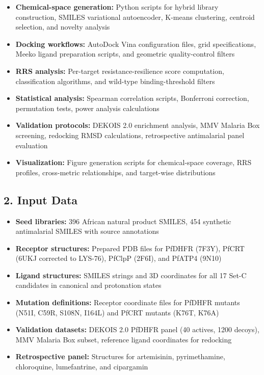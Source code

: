 \documentclass[11pt,a4paper]{article}
\begin{document}
\begin{itemize}[leftmargin=*]
\item \textbf{Chemical-space generation:} Python scripts for hybrid library construction, SMILES variational autoencoder, K-means clustering, centroid selection, and novelty analysis
\item \textbf{Docking workflows:} AutoDock Vina configuration files, grid specifications, Meeko ligand preparation scripts, and geometric quality-control filters
\item \textbf{RRS analysis:} Per-target resistance-resilience score computation, classification algorithms, and wild-type binding-threshold filters
\item \textbf{Statistical analysis:} Spearman correlation scripts, Bonferroni correction, permutation tests, power analysis calculations
\item \textbf{Validation protocols:} DEKOIS 2.0 enrichment analysis, MMV Malaria Box screening, redocking RMSD calculations, retrospective antimalarial panel evaluation
\item \textbf{Visualization:} Figure generation scripts for chemical-space coverage, RRS profiles, cross-metric relationships, and target-wise distributions
\end{itemize}

\subsection*{2. Input Data}

\begin{itemize}[leftmargin=*]
\item \textbf{Seed libraries:} 396 African natural product SMILES, 454 synthetic antimalarial SMILES with source annotations
\item \textbf{Receptor structures:} Prepared PDB files for PfDHFR (7F3Y), PfCRT (6UKJ corrected to LYS-76), PfClpP (2F6I), and PfATP4 (9N10)
\item \textbf{Ligand structures:} SMILES strings and 3D coordinates for all 17 Set-C candidates in canonical and protonation states
\item \textbf{Mutation definitions:} Receptor coordinate files for PfDHFR mutants (N51I, C59R, S108N, I164L) and PfCRT mutants (K76T, K76A)
\item \textbf{Validation datasets:} DEKOIS 2.0 PfDHFR panel (40 actives, 1200 decoys), MMV Malaria Box subset, reference ligand coordinates for redocking
\item \textbf{Retrospective panel:} Structures for artemisinin, pyrimethamine, chloroquine, lumefantrine, and cipargamin
\end{itemize}
\end{document}
